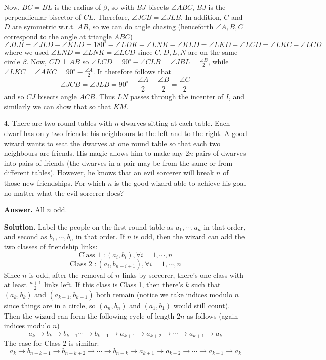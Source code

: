 \documentclass[11pt,a4paper]{article}
\begin{document}
\begin{enumerate}
	Now, $BC=BL$ is the radius of $\beta$, so with $BJ$ bisects $\angle ABC$, 
	$BJ$ is the perpendicular bisector of $CL$. 
	Therefore, $\angle JCB=\angle  JLB$. 
	In addition, $C$ and $D$ are symmetric w.r.t. $AB$, so we can do angle chasing (henceforth $\angle A, B, C$ correspond to the angle at triangle $ABC$)
	\[
	\angle JLB = 
	\angle JLD - \angle KLD
	= 180^{\circ} - \angle LDK - \angle LNK  - \angle KLD 
	=\angle LKD - \angle LCD
	=\angle LKC - \angle LCD
	\]
	where we used $\angle LND = \angle LNK = \angle LCD$ since $C, D, L, N$ are on the same circle $\beta$. 
	Now, $CD\perp AB$ so $\angle LCD=90^{\circ} - \angle CLB = \angle JBL = \frac{\angle B}{2}$, 
	while $\angle LKC = \angle AKC = 90^{\circ} - \frac{\angle A}{2}$. 
	It therefore follows that 
	\[
	\angle JCB=\angle  JLB=90^{\circ} - \frac{\angle A}{2}-\frac{\angle B}{2}=\frac{\angle C}{2}
	\]
	and so $CJ$ bisects angle $ACB$. 
	Thus $LN$ passes through the incenter of $I$, and similarly we can show that so that $KM$. 
	
	\item[4.]
	There are two round tables with $n$ dwarves sitting at each table. 
	Each dwarf has only two friends: his neighbours to the left and to the right. 
	A good wizard wants to seat the dwarves at one round table so that each two neighbours are friends. 
	His magic allows him to make any $2n$ pairs of dwarves into pairs of friends 
	(the dwarves in a pair may be from the same or from different tables). 
	However, he knows that an evil sorcerer will break $n$ of those new friendships. 
	For which $n$ is the good wizard able to achieve his goal no matter what the evil sorcerer does?
	
	\textbf{Answer.} All $n$ odd. 
	
	\textbf{Solution.} Label the people on the first round table as $a_1, \cdots, a_n$ in that order, 
	and second as $b_1, \cdots, b_n$ in that order. 
	If $n$ is odd, then the wizard can add the two classes of friendship links:
	\[
	\text{Class 1 }: (a_i, b_i), \forall i=1, \cdots, n
	\] 
	\[
	\text{Class 2 }: (a_i, b_{n-i+1}), \forall i=1, \cdots, n
	\]
	Since $n$ is odd, after the removal of $n$ links by sorcerer, 
	there's one class with at least $\frac{n+1}{2}$ links left. 
	If this class is Class 1, then there's $k$ such that $(a_k, b_k)$ and $(a_{k+1}, b_{k+1})$ both remain 
	(notice we take indices modulo $n$ since things are in a circle, so $(a_n, b_n)$ and $(a_1, b_1)$ would still count). 
	Then the wizard can form the following cycle of length $2n$ as follows (again indices modulo $n$)
	\[
	a_k\to b_k\to b_{k-1}\cdots \to b_{k+1}\to a_{k+1}\to a_{k+2}\to \cdots \to a_{k+1}\to a_k
	\]
	The case for Class 2 is similar: 
	\[
	a_k\to b_{n-k+1}\to b_{n-k+2}\to\cdots \to b_{n-k}\to a_{k+1}\to a_{k+2}\to \cdots \to a_{k+1}\to a_k
	\]
	

\end{enumerate}
\end{document}
